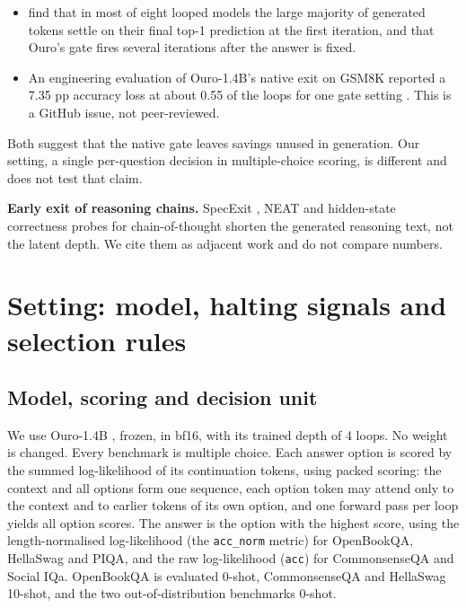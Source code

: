 \begin{itemize}
\tightlist
\item
  \citet{Olszowiec2026} find that in most of eight looped models the large majority of generated tokens settle on their final
  top-1 prediction at the first iteration, and that Ouro's gate fires several iterations after the answer is fixed.
\item
  An engineering evaluation of Ouro-1.4B's native exit on GSM8K reported a 7.35 pp accuracy loss at about 0.55 of the loops for one gate
  setting \citep{vllmrlt56}. This is a GitHub issue, not peer-reviewed.
\end{itemize}

Both suggest that the native gate leaves savings unused in generation. Our setting, a single per-question decision in multiple-choice
scoring, is different and does not test that claim.

\textbf{Early exit of reasoning chains.} SpecExit \citep{Yang2026}, NEAT \citep{Liu2026} and hidden-state correctness probes for chain-of-thought \citep{Zhang2025}
shorten the generated reasoning text, not the latent depth. We cite them as adjacent work and do not compare numbers.

\section{Setting: model, halting signals and selection rules}

\subsection{Model, scoring and decision unit}

We use Ouro-1.4B \citep{Zhu2025}, frozen, in bf16, with its trained depth of 4 loops. No weight is changed. Every benchmark is multiple choice. Each answer option is scored by the summed log-likelihood of its continuation tokens, using packed scoring: the context and all options form one sequence, each option token may attend only to the context and to earlier tokens of its own option, and one forward pass per loop yields all option scores. The answer is the option with the highest score, using the length-normalised log-likelihood (the \texttt{acc\_norm} metric) for OpenBookQA, HellaSwag and PIQA, and the raw log-likelihood (\texttt{acc}) for CommonsenseQA and Social IQa. OpenBookQA is evaluated 0-shot, CommonsenseQA and HellaSwag 10-shot, and the two out-of-distribution benchmarks 0-shot.

